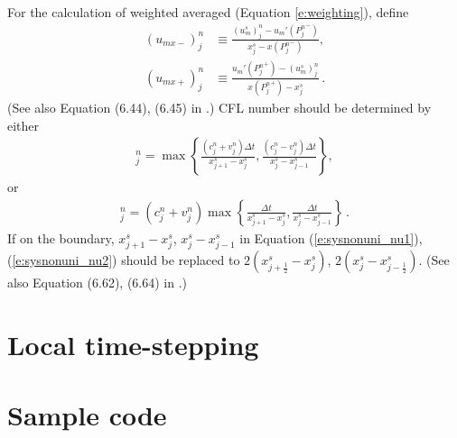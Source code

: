 \documentclass[11pt,dvips]{article}
\numberwithin{equation}{section}
\begin{document}
For the calculation of weighted averaged (Equation \ref{e:weighting}), define
\begin{align}
  (u_{mx-})_j^n &\equiv
    \frac{(u_m^s)_j^n-u_m'({P_j^n}^-)}{x_j^s-x({P_j^n}^-)}, \\
  (u_{mx+})_j^n &\equiv
    \frac{u_m'({P_j^n}^+)-(u_m^s)_j^n}{x({P_j^n}^+)-x_j^s}\,.
\end{align}
(See also Equation (6.44), (6.45) in \cite{chang_not_2008}.) CFL number should
be determined by either
\begin{align}
  [\nu^{(1)}]_j^n =
    \max\left\{
      \frac{(c_j^n+v_j^n)\Delta t}{x_{j+1}^s-x_j^s},
      \frac{(c_j^n-v_j^n)\Delta t}{x_j^s-x_{j-1}^s}
    \right\}, \label{e:sysnonuni_nu1}
\end{align}
or
\begin{align}
  [\nu^{(2)}]_j^n =
    (c_j^n+v_j^n)\max\left\{
      \frac{\Delta t}{x_{j+1}^s-x_j^s},
      \frac{\Delta t}{x_j^s-x_{j-1}^s}
    \right\}\,. \label{e:sysnonuni_nu2}
\end{align}
If on the boundary, $x_{j+1}^s-x_j^s$, $x_j^s-x_{j-1}^s$ in Equation
(\ref{e:sysnonuni_nu1}), (\ref{e:sysnonuni_nu2}) should be replaced to
$2(x_{j+\frac{1}{2}}^s-x_j^s)$, $2(x_j^s-x_{j-\frac{1}{2}}^s)$.  (See also
Equation (6.62), (6.64) in \cite{chang_not_2008}.)

\section{Local time-stepping}
\label{s:lts}

\section{Sample code}
\label{s:code}

\clearpage


\end{document}
